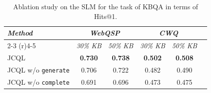 


\renewcommand{\arraystretch}{1.0}
\begin{table}[t]
\small
\centering
\setlength{\tabcolsep}{1.0pt}
\begin{tabular}{lccccc}
\toprule
\multirow{2}{*}{\textit{\textbf{Method}}} & \multicolumn{2}{c}{\textit{\textbf{WebQSP}}} & \multicolumn{2}{c}{\textit{\textbf{CWQ}}} \\ \cmidrule(r){2-3} \cmidrule(r){4-5} 
                               & \textit{30\% KB} & \textit{50\% KB} & \textit{30\% KB} & \textit{50\% KB} \\ 
\midrule
JCQL                                 & \textbf{0.730} & \textbf{0.738} & \textbf{0.502} & \textbf{0.508} \\
JCQL w/o  \texttt{generate}                   & 0.706 & 0.722 & 0.482 & 0.490 \\
JCQL w/o  \texttt{complete}                   & 0.691 & 0.696 & 0.473 & 0.475 \\  
\bottomrule
\end{tabular}%
\vspace{-1mm}
\caption{Ablation study on the SLM for the task of KBQA in terms of Hits@1.}
\label{Effect Analysis of Complete Action}
\end{table}
\renewcommand{\arraystretch}{1}

